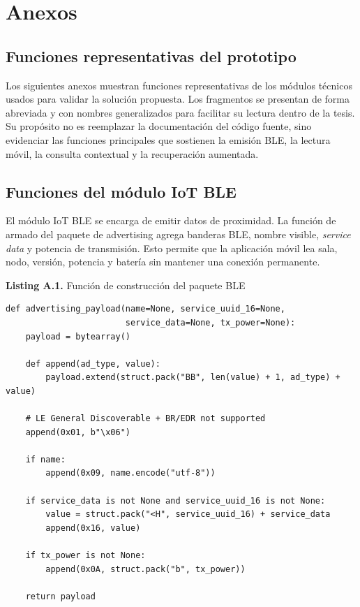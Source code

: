 \chapter{Anexos}

\section{Funciones representativas del prototipo}

Los siguientes anexos muestran funciones representativas de los módulos técnicos usados para validar la solución propuesta. Los fragmentos se presentan de forma abreviada y con nombres generalizados para facilitar su lectura dentro de la tesis. Su propósito no es reemplazar la documentación del código fuente, sino evidenciar las funciones principales que sostienen la emisión BLE, la lectura móvil, la consulta contextual y la recuperación aumentada.

\section{Funciones del módulo IoT BLE}

El módulo IoT BLE se encarga de emitir datos de proximidad. La función de armado del paquete de advertising agrega banderas BLE, nombre visible, \textit{service data} y potencia de transmisión. Esto permite que la aplicación móvil lea sala, nodo, versión, potencia y batería sin mantener una conexión permanente.

\begin{center}
\textbf{Listing A.1.} Función de construcción del paquete BLE
\end{center}

\begin{lstlisting}[style=pythoncode]
def advertising_payload(name=None, service_uuid_16=None,
                        service_data=None, tx_power=None):
    payload = bytearray()

    def append(ad_type, value):
        payload.extend(struct.pack("BB", len(value) + 1, ad_type) + value)

    # LE General Discoverable + BR/EDR not supported
    append(0x01, b"\x06")

    if name:
        append(0x09, name.encode("utf-8"))

    if service_data is not None and service_uuid_16 is not None:
        value = struct.pack("<H", service_uuid_16) + service_data
        append(0x16, value)

    if tx_power is not None:
        append(0x0A, struct.pack("b", tx_power))

    return payload
\end{lstlisting}

